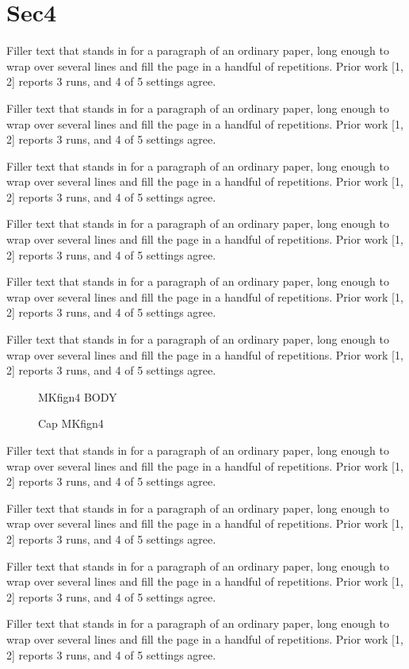 \documentclass{article}
\begin{document}
\section{Sec4}
Filler text that stands in for a paragraph of an ordinary paper, long enough to wrap over several lines and fill the page in a handful of repetitions. Prior work [1, 2] reports 3 runs, and 4 of 5 settings agree.\par
Filler text that stands in for a paragraph of an ordinary paper, long enough to wrap over several lines and fill the page in a handful of repetitions. Prior work [1, 2] reports 3 runs, and 4 of 5 settings agree.\par
Filler text that stands in for a paragraph of an ordinary paper, long enough to wrap over several lines and fill the page in a handful of repetitions. Prior work [1, 2] reports 3 runs, and 4 of 5 settings agree.\par
Filler text that stands in for a paragraph of an ordinary paper, long enough to wrap over several lines and fill the page in a handful of repetitions. Prior work [1, 2] reports 3 runs, and 4 of 5 settings agree.\par
Filler text that stands in for a paragraph of an ordinary paper, long enough to wrap over several lines and fill the page in a handful of repetitions. Prior work [1, 2] reports 3 runs, and 4 of 5 settings agree.\par
Filler text that stands in for a paragraph of an ordinary paper, long enough to wrap over several lines and fill the page in a handful of repetitions. Prior work [1, 2] reports 3 runs, and 4 of 5 settings agree.\par
\begin{figure}[t]\centering MKfign4 BODY\caption{Cap MKfign4}\label{fig:n4}\end{figure}
Filler text that stands in for a paragraph of an ordinary paper, long enough to wrap over several lines and fill the page in a handful of repetitions. Prior work [1, 2] reports 3 runs, and 4 of 5 settings agree.\par
Filler text that stands in for a paragraph of an ordinary paper, long enough to wrap over several lines and fill the page in a handful of repetitions. Prior work [1, 2] reports 3 runs, and 4 of 5 settings agree.\par
Filler text that stands in for a paragraph of an ordinary paper, long enough to wrap over several lines and fill the page in a handful of repetitions. Prior work [1, 2] reports 3 runs, and 4 of 5 settings agree.\par
Filler text that stands in for a paragraph of an ordinary paper, long enough to wrap over several lines and fill the page in a handful of repetitions. Prior work [1, 2] reports 3 runs, and 4 of 5 settings agree.\par
\end{document}
